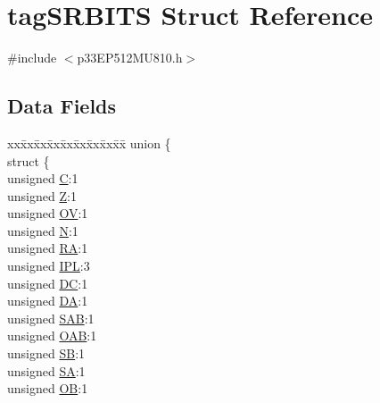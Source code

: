 \hypertarget{structtag_s_r_b_i_t_s}{}\section{tag\+S\+R\+B\+I\+TS Struct Reference}
\label{structtag_s_r_b_i_t_s}


{\ttfamily \#include $<$p33\+E\+P512\+M\+U810.\+h$>$}

\subsection*{Data Fields}
\begin{DoxyCompactItemize}
\item 
\begin{tabbing}
xx\=xx\=xx\=xx\=xx\=xx\=xx\=xx\=xx\=\kill
union \{\\
\>struct \{\\
\>\>unsigned \hyperlink{structtag_s_r_b_i_t_s_ad9acb3cfadaceafecace890937990653}{C}:1\\
\>\>unsigned \hyperlink{structtag_s_r_b_i_t_s_ac908725f95d2f115071b18f9dc888e79}{Z}:1\\
\>\>unsigned \hyperlink{structtag_s_r_b_i_t_s_a708a252af439571331085cd1fc12b698}{OV}:1\\
\>\>unsigned \hyperlink{structtag_s_r_b_i_t_s_a78d6eaf1636482a27da7047fd73c78c3}{N}:1\\
\>\>unsigned \hyperlink{structtag_s_r_b_i_t_s_a11895546e4853db4e31c6b25120597a4}{RA}:1\\
\>\>unsigned \hyperlink{structtag_s_r_b_i_t_s_a7971bb66ce5b06600de524d226de0663}{IPL}:3\\
\>\>unsigned \hyperlink{structtag_s_r_b_i_t_s_a3d90f65cd752460060c0eba9c09f9034}{DC}:1\\
\>\>unsigned \hyperlink{structtag_s_r_b_i_t_s_a2a853448331016033268b3a21c6ac8a6}{DA}:1\\
\>\>unsigned \hyperlink{structtag_s_r_b_i_t_s_af5d17ab5ec838d19aea58ad672f159e9}{SAB}:1\\
\>\>unsigned \hyperlink{structtag_s_r_b_i_t_s_a3f40ec716b8b3b46630716b72823f4fb}{OAB}:1\\
\>\>unsigned \hyperlink{structtag_s_r_b_i_t_s_a5fecf077a833f342a87553f24344e582}{SB}:1\\
\>\>unsigned \hyperlink{structtag_s_r_b_i_t_s_a957696e590efe4c98abd19a87a0eacf5}{SA}:1\\
\>\>unsigned \hyperlink{structtag_s_r_b_i_t_s_a9bdf43b56e7fd1f3ee0d1822e5533ee8}{OB}:1\\

\end{tabbing}
\end{DoxyCompactItemize}
